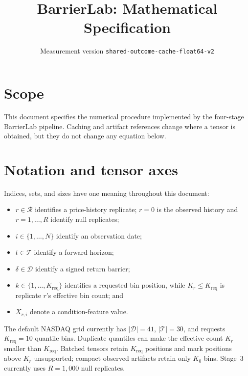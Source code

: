 \documentclass[11pt]{article}
\title{BarrierLab: Mathematical Specification}
\author{}
\date{Measurement version \texttt{shared-outcome-cache-float64-v2}}
\begin{document}
\maketitle
\tableofcontents

\section{Scope}

This document specifies the numerical procedure implemented by the four-stage
BarrierLab pipeline. Caching and artifact references change where a tensor is
obtained, but they do not change any equation below.

\section{Notation and tensor axes}

Indices, sets, and sizes have one meaning throughout this document:
\begin{itemize}[nosep]
  \item $r\in\mathcal R$ identifies a price-history replicate; $r=0$ is the
        observed history and $r=1,\ldots,R$ identify null replicates;
  \item $i\in\{1,\ldots,N\}$ identify an observation date;
  \item $t\in\mathcal T$ identify a forward horizon;
  \item $\delta\in\mathcal D$ identify a signed return barrier;
  \item $k\in\{1,\ldots,K_{\mathrm{req}}\}$ identifies a requested bin
        position, while $K_r\leq K_{\mathrm{req}}$ is replicate $r$'s
        effective bin count; and
  \item $X_{r,i}$ denote a condition-feature value.
\end{itemize}

The default NASDAQ grid currently has $|\mathcal D|=41$,
$|\mathcal T|=30$, and requests $K_{\mathrm{req}}=10$ quantile bins.
Duplicate quantiles can make the effective count $K_r$ smaller than
$K_{\mathrm{req}}$. Batched tensors retain $K_{\mathrm{req}}$ positions and
mark positions above $K_r$ unsupported; compact observed artifacts retain
only $K_0$ bins. Stage~3 currently uses $R=1{,}000$ null replicates.
\end{document}

